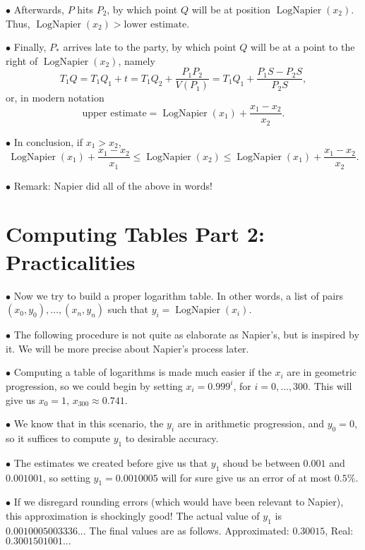 \documentclass{article}
\newcommand\point[1]{\noindent \hspace{\labelsep} $\bullet$ #1 \smallskip}
\DeclareMathOperator{\lognap}{LogNapier}
\begin{document}
\point{Afterwards, $P$ hits $P_2$, by which point $Q$ will be at position $\lognap(x_2)$. Thus, $\lognap(x_2) > \text{lower estimate}$.}

\point{Finally, $P_*$ arrives late to the party, by which point $Q$ will be at a point to the right of $\lognap(x_2)$, namely
\begin{equation}
T_1 Q = T_1 Q_1 + t = T_1 Q_2 + \frac{P_1 P_2}{V(P_1)} = T_1 Q_1 + \frac{P_1 S -  P_2 S}{P_2 S},
\end{equation}
or, in modern notation
\begin{equation}
\text{upper estimate} = \lognap(x_1) + \frac{x_1 - x_2}{x_2}.
\end{equation}}

\point{In conclusion, if $x_1 > x_2$,
\begin{equation}
\lognap(x_1) + \frac{x_1 - x_2}{x_1} \leq \lognap(x_2) \leq \lognap(x_1) + \frac{x_1 - x_2}{x_2}.
\end{equation}}

\point{Remark: Napier did all of the above in words!}

\section{Computing Tables Part 2: Practicalities}

\point{Now we try to build a proper logarithm table. In other words, a list of pairs $(x_0, y_0), \dots, (x_n, y_n)$ such that $y_i = \lognap(x_i)$.}

\point{The following procedure is not quite as elaborate as Napier's, but is inspired by it. We will be more precise about Napier's process later.}

\point{Computing a table of logarithms is made much easier if the $x_i$ are in geometric progression, so we could begin by setting $x_i = 0.999^i$, for $i = 0, \dots, 300$. This will give us $x_0 = 1$, $x_{300} \approx 0.741$.}

\point{We know that in this scenario, the $y_i$ are in arithmetic progression, and $y_0 = 0$, so it suffices to compute $y_1$ to desirable accuracy.}

\point{The estimates we created before give us that $y_1$ shoud be between $0.001$ and $0.001001$, so setting $y_1 = 0.0010005$ will for sure give us an error of at most $0.5\%$.}

\point{If we disregard rounding errors (which would have been relevant to Napier), this approximation is shockingly good! The actual value of $y_1$ is $0.0010005003336...$ The final values are as follows. Approximated: $0.30015$, Real: $0.3001501001...$}
\end{document}
